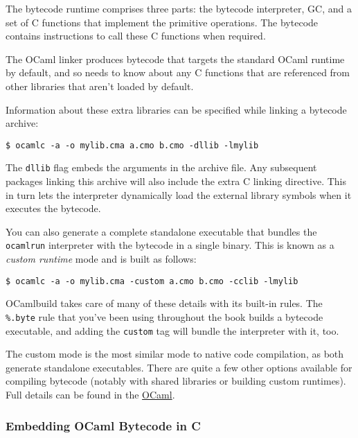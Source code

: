 The bytecode runtime comprises three parts: the bytecode interpreter,
GC, and a set of C functions that implement the primitive operations.
The bytecode contains instructions to call these C functions when
required.

The OCaml linker produces bytecode that targets the standard OCaml
runtime by default, and so needs to know about any C functions that are
referenced from other libraries that aren't loaded by default.

Information about these extra libraries can be specified while linking a
bytecode archive:

\begin{lstlisting}
$ ocamlc -a -o mylib.cma a.cmo b.cmo -dllib -lmylib
\end{lstlisting}

The \passthrough{\lstinline!dllib!} flag embeds the arguments in the
archive file. Any subsequent packages linking this archive will also
include the extra C linking directive. This in turn lets the interpreter
dynamically load the external library symbols when it executes the
bytecode.

You can also generate a complete standalone executable that bundles the
\passthrough{\lstinline!ocamlrun!} interpreter with the bytecode in a
single binary. This is known as a \emph{custom runtime} mode and is
built as follows: 

\begin{lstlisting}
$ ocamlc -a -o mylib.cma -custom a.cmo b.cmo -cclib -lmylib
\end{lstlisting}

OCamlbuild takes care of many of these details with its built-in rules.
The \passthrough{\lstinline!\%.byte!} rule that you've been using
throughout the book builds a bytecode executable, and adding the
\passthrough{\lstinline!custom!} tag will bundle the interpreter with
it, too. 

The custom mode is the most similar mode to native code compilation, as
both generate standalone executables. There are quite a few other
options available for compiling bytecode (notably with shared libraries
or building custom runtimes). Full details can be found in the
\href{http://caml.inria.fr/pub/docs/manual-ocaml/manual022.html}{OCaml}.

\hypertarget{embedding-ocaml-bytecode-in-c}{%
\subsubsection{Embedding OCaml Bytecode in
C}\label{embedding-ocaml-bytecode-in-c}}

